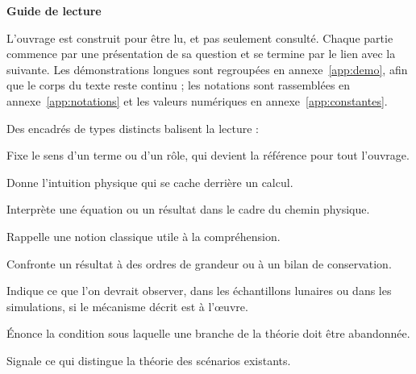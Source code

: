 \documentclass[11pt,a4paper,openany]{report}
\begin{document}
\clearpage
\thispagestyle{plain}
\begin{center}{\Large\bfseries Guide de lecture}\end{center}
\medskip

L'ouvrage est construit pour être lu, et pas seulement consulté. Chaque partie commence par une
présentation de sa question et se termine par le lien avec la suivante. Les démonstrations
longues sont regroupées en annexe~\ref{app:demo}, afin que le corps du texte reste continu ; les
notations sont rassemblées en annexe~\ref{app:notations} et les valeurs numériques en
annexe~\ref{app:constantes}.

Des encadrés de types distincts balisent la lecture :

\begin{definition}
Fixe le sens d'un terme ou d'un rôle, qui devient la référence pour tout l'ouvrage.
\end{definition}
\begin{ideephys}
Donne l'intuition physique qui se cache derrière un calcul.
\end{ideephys}
\begin{lecture}
Interprète une équation ou un résultat dans le cadre du chemin physique.
\end{lecture}
\begin{rappel}
Rappelle une notion classique utile à la compréhension.
\end{rappel}
\begin{controle}
Confronte un résultat à des ordres de grandeur ou à un bilan de conservation.
\end{controle}
\begin{consequence}
Indique ce que l'on devrait observer, dans les échantillons lunaires ou dans les simulations,
si le mécanisme décrit est à l'\oe uvre.
\end{consequence}
\begin{falsif}
Énonce la condition sous laquelle une branche de la théorie doit être abandonnée.
\end{falsif}
\begin{apport}
Signale ce qui distingue la théorie des scénarios existants.
\end{apport}

\clearpage
\tableofcontents

\clearpage
{}
\end{document}
